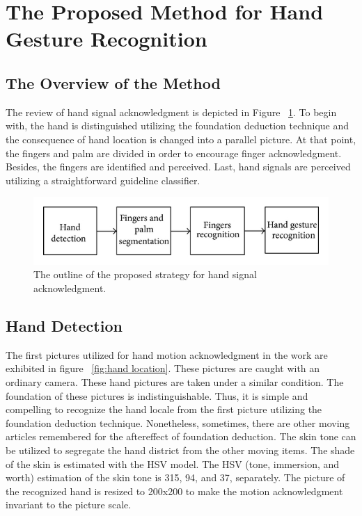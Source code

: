 \documentclass[a4paper]{article}
\begin{document}
\section{The Proposed Method for Hand Gesture Recognition}

\subsection{The Overview of the Method}
The review of hand signal acknowledgment is depicted in Figure ~\ref{fig:The outline}. To begin with, the hand is distinguished utilizing the foundation deduction technique and the consequence of hand location is changed into a parallel picture. At that point, the fingers and palm are divided in order to encourage finger acknowledgment. Besides, the fingers are identified and perceived. Last, hand signals are perceived utilizing a straightforward guideline classifier.


\begin{figure}[h!]
 \begin{center}
  \includegraphics[scale=1.7]{fig1}
  \caption{The outline of the proposed strategy for hand signal acknowledgment.}
  \label{fig:The outline}
 \end{center}
\end{figure}




\subsection{Hand Detection}
The first pictures utilized for hand motion acknowledgment in the work are exhibited in figure ~\ref{fig:hand location}. These pictures are caught with an ordinary camera. These hand pictures are taken under a similar condition. The foundation of these pictures is indistinguishable. Thus, it is simple and compelling to recognize the hand locale from the first picture utilizing the foundation deduction technique. Nonetheless, sometimes, there are other moving articles remembered for the aftereffect of foundation deduction. The skin tone can be utilized to segregate the hand district from the other moving items. The shade of the skin is estimated with the HSV model. The HSV (tone, immersion, and worth) estimation of the skin tone is 315, 94, and 37, separately. The picture of the recognized hand is resized to 200x200 to make the motion acknowledgment invariant to the picture scale.
\end{document}
